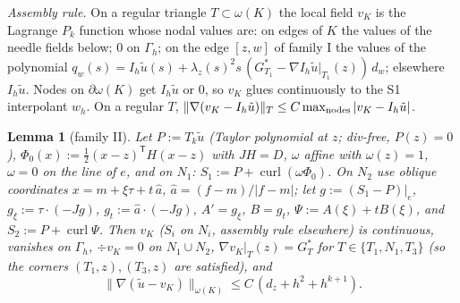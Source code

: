 \documentclass[11pt]{article}
\newtheorem{lemma}[theorem]{Lemma}
\theoremstyle{remark}
\newcommand{\norm}[1]{\|#1\|}
\newcommand{\curl}{\operatorname{curl}}
\begin{document}
\emph{Assembly rule.} On a regular triangle $T\subset\omega(K)$ the local field $v_K$ is the Lagrange $P_k$ function whose nodal values are: on edges of $K$ the
values of the needle fields below; $0$ on $\Gamma_h$; on the edge $[z,w]$ of family I the values of the polynomial
$q_w(s)=I_h\tilde u(s)+\lambda_z(s)^2 s\,(G^*_{T_1}-\nabla I_h\tilde u|_{T_1}(z))\,d_w$; elsewhere $I_h\tilde u$. Nodes on $\partial\omega(K)$ get $I_h\tilde u$ or $0$, so $v_K$
glues continuously to the S1 interpolant $w_h$. On a regular $T$, $\norm{\nabla(v_K-I_h\tilde u)}_T\le C\max_{\rm nodes}|v_K-I_h\tilde u|$.

\begin{lemma}[family II]\label{lem:A2}
Let $P:=T_k\tilde u$ (Taylor polynomial at $z$; div-free, $P(z)=0$), $\Phi_0(x):=\frac12(x-z)^{\mathsf T}H(x-z)$ with $JH=D$, $\omega$ affine with $\omega(z)=1$,
$\omega=0$ on the line of $e$, and on $N_1$: $S_1:=P+\curl(\omega\Phi_0)$. On $N_2$ use oblique coordinates $x=m+\xi\tau+t\,\hat a$, $\hat a=(f-m)/|f-m|$; let
$g:=(S_1-P)|_e$, $g_\xi:=\tau\cdot(-Jg)$, $g_t:=\hat a\cdot(-Jg)$, $A'=g_\xi$, $B=g_t$, $\Psi:=A(\xi)+tB(\xi)$, and $S_2:=P+\curl\Psi$. Then $v_K$ ($S_i$ on $N_i$, assembly rule
elsewhere) is continuous, vanishes on $\Gamma_h$, $\div v_K=0$ on $N_1\cup N_2$, $\nabla v_K|_T(z)=G^*_T$ for $T\in\{T_1,N_1,T_3\}$ (so the corners
$(T_1,z),(T_3,z)$ are satisfied), and
\[\norm{\nabla(\tilde u-v_K)}_{\omega(K)}\le C\,(d_z+h^2+h^{k+1}).\]
\end{lemma}
\end{document}
